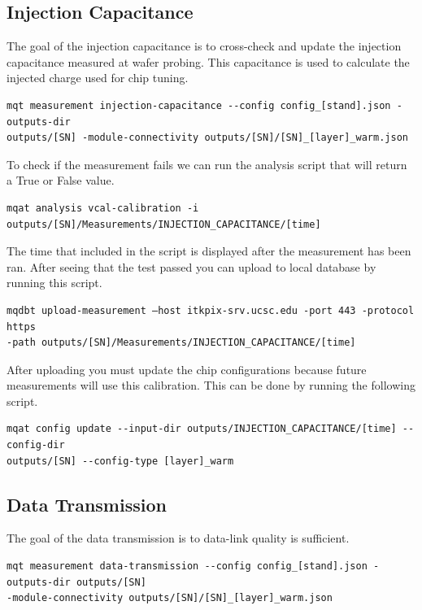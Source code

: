 \documentclass[12pt]{article}
\begin{document}
\subsection{Injection Capacitance}

The goal of the injection capacitance is to cross-check and update the injection capacitance measured at wafer probing. This capacitance is used to calculate the injected charge used for chip tuning. 

\begin{verbatim}
mqt measurement injection-capacitance --config config_[stand].json -outputs-dir 
outputs/[SN] -module-connectivity outputs/[SN]/[SN]_[layer]_warm.json
\end{verbatim}

To check if the measurement fails we can run the analysis script that will return a True or False value. 
\begin{verbatim}
mqat analysis vcal-calibration -i outputs/[SN]/Measurements/INJECTION_CAPACITANCE/[time]
\end{verbatim}

The time that included in the script is displayed after the measurement has been ran. After seeing that the test passed you can upload to local database by running this script. 

\begin{verbatim}
mqdbt upload-measurement –host itkpix-srv.ucsc.edu -port 443 -protocol https
-path outputs/[SN]/Measurements/INJECTION_CAPACITANCE/[time]
\end{verbatim}
After uploading you must update the chip configurations because future measurements will use this calibration. This can be done by running the following script. 
\begin{verbatim}
mqat config update --input-dir outputs/INJECTION_CAPACITANCE/[time] --config-dir 
outputs/[SN] --config-type [layer]_warm
\end{verbatim}

\subsection{Data Transmission}

The goal of the data transmission is to data-link quality is sufficient.

\begin{verbatim}
mqt measurement data-transmission --config config_[stand].json -outputs-dir outputs/[SN]
-module-connectivity outputs/[SN]/[SN]_[layer]_warm.json
\end{verbatim}
\end{document}
